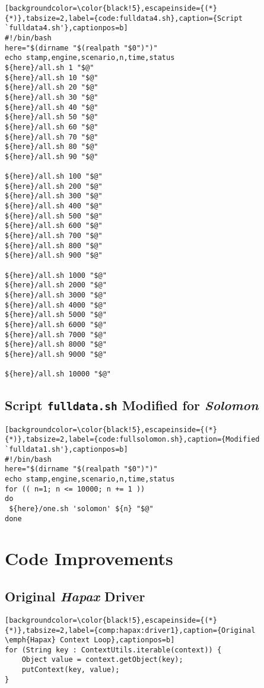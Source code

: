 \begin{lstlisting}[backgroundcolor=\color{black!5},escapeinside={(*}{*)},tabsize=2,label={code:fulldata4.sh},caption={Script `fulldata4.sh'},captionpos=b]
#!/bin/bash
here="$(dirname "$(realpath "$0")")"
echo stamp,engine,scenario,n,time,status
${here}/all.sh 1 "$@"
${here}/all.sh 10 "$@"
${here}/all.sh 20 "$@"
${here}/all.sh 30 "$@"
${here}/all.sh 40 "$@"
${here}/all.sh 50 "$@"
${here}/all.sh 60 "$@"
${here}/all.sh 70 "$@"
${here}/all.sh 80 "$@"
${here}/all.sh 90 "$@"

${here}/all.sh 100 "$@"
${here}/all.sh 200 "$@"
${here}/all.sh 300 "$@"
${here}/all.sh 400 "$@"
${here}/all.sh 500 "$@"
${here}/all.sh 600 "$@"
${here}/all.sh 700 "$@"
${here}/all.sh 800 "$@"
${here}/all.sh 900 "$@"

${here}/all.sh 1000 "$@"
${here}/all.sh 2000 "$@"
${here}/all.sh 3000 "$@"
${here}/all.sh 4000 "$@"
${here}/all.sh 5000 "$@"
${here}/all.sh 6000 "$@"
${here}/all.sh 7000 "$@"
${here}/all.sh 8000 "$@"
${here}/all.sh 9000 "$@"

${here}/all.sh 10000 "$@"
\end{lstlisting}

\subsection*{Script \texttt{fulldata.sh} Modified for \emph{Solomon}}
\label{appendix:fullsolomon.sh}

\begin{lstlisting}[backgroundcolor=\color{black!5},escapeinside={(*}{*)},tabsize=2,label={code:fullsolomon.sh},caption={Modified `fulldata1.sh'},captionpos=b]
#!/bin/bash
here="$(dirname "$(realpath "$0")")"
echo stamp,engine,scenario,n,time,status
for (( n=1; n <= 10000; n += 1 ))
do
 ${here}/one.sh 'solomon' ${n} "$@"
done
\end{lstlisting}

\section*{Code Improvements}

\subsection*{Original \emph{Hapax} Driver}
\label{appendix:hapax:driver1}

\begin{lstlisting}[backgroundcolor=\color{black!5},escapeinside={(*}{*)},tabsize=2,label={comp:hapax:driver1},caption={Original \emph{Hapax} Context Loop},captionpos=b]
for (String key : ContextUtils.iterable(context)) {
    Object value = context.getObject(key);
    putContext(key, value);
}
\end{lstlisting}

